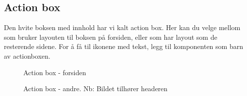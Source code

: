 \begin{figure}[H]
    \centering
    \label{fig:cms-header-front-page}
\end{figure}

\subsection{Action box}
Den hvite boksen med innhold har vi kalt action box. Her kan du velge mellom  som bruker layouten til boksen på forsiden, eller  som har layout som de resterende sidene. For å få til ikonene med tekst, legg til komponenten  som barn av actionboxen.

\begin{figure}[H]
    \centering
    \label{fig:cms-action-box-fp}
    \caption{Action box - forsiden}
\end{figure}

\begin{figure}[H]
    \centering
    \label{fig:cms-action-box-other}
    \caption{Action box - andre. Nb: Bildet tilhører headeren}
\end{figure}

